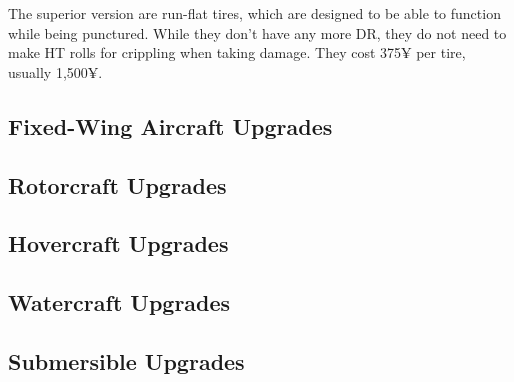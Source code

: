 \begin{multicols*}{2}
	The superior version are run-flat tires, which are designed to be able to function while being punctured. While they don't have any more DR, they do not need to make HT rolls for crippling when taking damage. They cost 375¥ per tire, usually 1,500¥.	

	\subsection{Fixed-Wing Aircraft Upgrades}
	
	\subsection{Rotorcraft Upgrades}
	
	\subsection{Hovercraft Upgrades}
	
	\subsection{Watercraft Upgrades}
	
	\subsection{Submersible Upgrades}


\end{multicols*}
